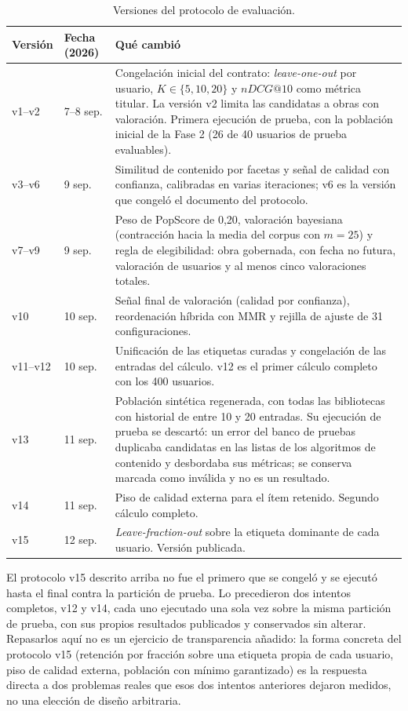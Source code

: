 \begin{table}[htp]
\centering
\small
\begin{tabularx}{\textwidth}{ | C{0.13\textwidth} | C{0.13\textwidth} | Y | }
    \hline
    \textbf{Versión} & \textbf{Fecha (2026)} & \textbf{Qué cambió} \\
    \hline
    v1--v2 & 7--8 sep. & Congelación inicial del contrato: \emph{leave-one-out} por usuario, \(K \in \{5, 10, 20\}\) y \(nDCG@10\) como métrica titular. La versión v2 limita las candidatas a obras con valoración. Primera ejecución de prueba, con la población inicial de la Fase 2 (26 de 40 usuarios de prueba evaluables). \\
    \hline
    v3--v6 & 9 sep. & Similitud de contenido por facetas y señal de calidad con confianza, calibradas en varias iteraciones; v6 es la versión que congeló el documento del protocolo. \\
    \hline
    v7--v9 & 9 sep. & Peso de PopScore de 0,20, valoración bayesiana (contracción hacia la media del corpus con \(m = 25\)) y regla de elegibilidad: obra gobernada, con fecha no futura, valoración de usuarios y al menos cinco valoraciones totales. \\
    \hline
    v10 & 10 sep. & Señal final de valoración (calidad por confianza), reordenación híbrida con MMR y rejilla de ajuste de 31 configuraciones. \\
    \hline
    v11--v12 & 10 sep. & Unificación de las etiquetas curadas y congelación de las entradas del cálculo. v12 es el primer cálculo completo con los 400 usuarios. \\
    \hline
    v13 & 11 sep. & Población sintética regenerada, con todas las bibliotecas con historial de entre 10 y 20 entradas. Su ejecución de prueba se descartó: un error del banco de pruebas duplicaba candidatas en las listas de los algoritmos de contenido y desbordaba sus métricas; se conserva marcada como inválida y no es un resultado. \\
    \hline
    v14 & 11 sep. & Piso de calidad externa para el ítem retenido. Segundo cálculo completo. \\
    \hline
    v15 & 12 sep. & \emph{Leave-fraction-out} sobre la etiqueta dominante de cada usuario. Versión publicada. \\
    \hline
\end{tabularx}
\caption{Versiones del protocolo de evaluación.}
\label{tab:exp-versiones}
\end{table}

El protocolo v15 descrito arriba no fue el primero que se congeló y se ejecutó hasta el final
contra la partición de prueba. Lo precedieron dos intentos completos, v12 y v14, cada uno
ejecutado una sola vez sobre la misma partición de prueba, con sus propios resultados publicados y
conservados sin alterar. Repasarlos aquí no es un ejercicio de transparencia añadido: la forma
concreta del protocolo v15 (retención por fracción sobre una etiqueta propia de cada usuario,
piso de calidad externa, población con mínimo garantizado) es la respuesta directa a dos
problemas reales que esos dos intentos anteriores dejaron medidos, no una elección de diseño
arbitraria.

